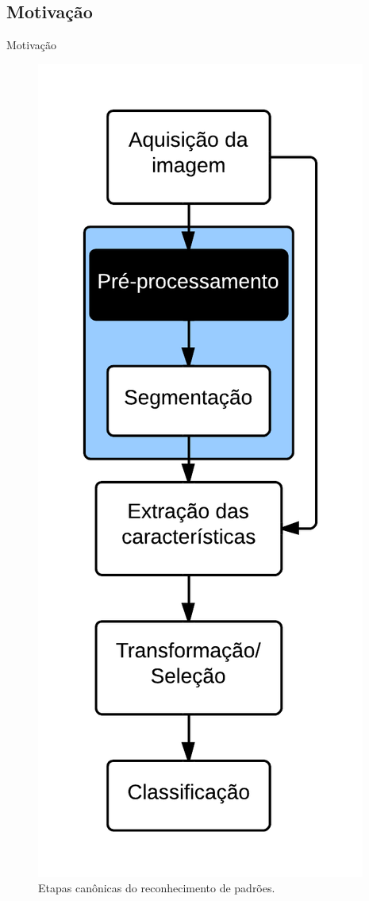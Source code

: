 \documentclass[10pt]{beamer}
\begin{document}
\subsection{Motivação}
\begin{frame}{Motivação}
  \setlength\leftmargini{1em}
  \begin{figure}
    \includegraphics[height=0.8\textheight]{figuras/flow.png}
    \caption{Etapas canônicas do reconhecimento de padrões.}
  \end{figure}
\end{frame}
\end{document}
